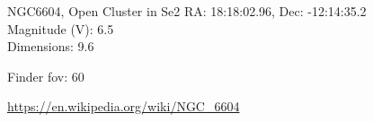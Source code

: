 \begin{block}{NGC6604, Open Cluster in Se2}
    RA: 18:18:02.96, Dec: -12:14:35.2 \\ 
    Magnitude (V): 6.5 \\ 
    Dimensions: 9.6 

    Finder fov: 60 

    \url{https://en.wikipedia.org/wiki/NGC_6604} 
\end{block}